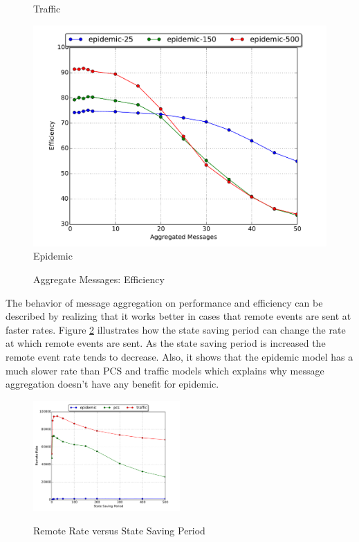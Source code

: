\documentclass[11pt]{book}
\begin{document}
\begin{figure}
\begin{minipage}{.5\textwidth}
\begin{center}
      Traffic \\
    \end{center}
  \end{minipage}
  \centering
  \begin{minipage}{.5\textwidth}
    \begin{center}
      \includegraphics[width=\textwidth,keepaspectratio,quiet]{figs/partitioning_communication/aggregate_epidemic_efficiency.pdf} \\
      Epidemic \\
    \end{center}
  \end{minipage}
  \caption{Aggregate Messages: Efficiency}\label{aggregate_efficiency}
\end{figure}
  
The behavior of message aggregation on performance and efficiency can be described by realizing that
it works better in cases that remote events are sent at faster rates.  Figure \ref{remote_ssp}
illustrates how the state saving period can change the rate at which remote events are sent.  As the
state saving period is increased the remote event rate tends to decrease.  Also, it shows that the
epidemic model has a much slower rate than PCS and traffic models which explains why message
aggregation doesn't have any benefit for epidemic.

\begin{figure}
  \centering
  \includegraphics[width=0.5\textwidth,keepaspectratio,quiet]{figs/state_saving/beowulf/remote_rate.pdf} \\
  \caption{Remote Rate versus State Saving Period}\label{remote_ssp}
\end{figure}
\end{document}
